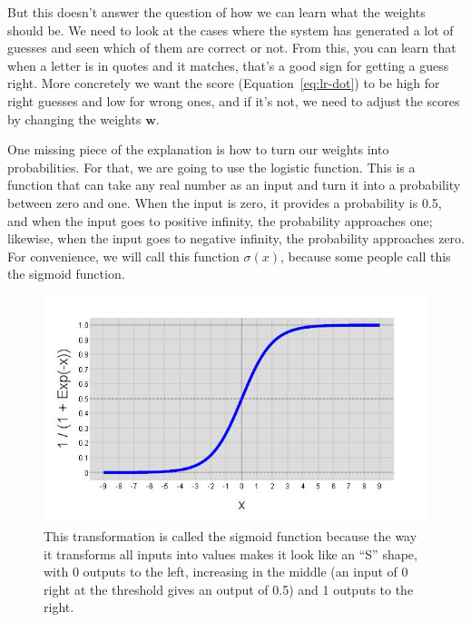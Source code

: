 But this doesn't answer the question of how we can learn what the weights
should be.
%
We need to look at the cases where the system has generated a lot of guesses
and seen which of them are correct or not.
%
From this, you can learn that when
a letter is in quotes and it matches, that’s a good sign for getting a guess right.
%
More concretely we want the score (Equation~\ref{eq:lr-dot}) to be high for
right guesses and low for wrong ones, and if it's not, we need to adjust the
scores by changing the weights ${\bm w}$.

One missing piece of the explanation is how to turn our weights into
probabilities.
%
For that, we are going to use the logistic function.
%
This is a function that can take any real number as an input and turn it into
a probability between zero and one.
%
When the input is zero, it provides a probability is 0.5, and when the input
goes to positive infinity, the probability approaches one; likewise, when the
input goes to negative infinity, the probability approaches zero.
%
For convenience, we will call this function $\sigma(x)$, because some people
call this the sigmoid function.

\begin{figure}
  \includegraphics[width=0.5\linewidth]{figures/plots/sigmoid}
\caption{This transformation is
  called the sigmoid function because the way it transforms all inputs into
  values makes it look like an ``S'' shape, with 0 outputs to the left,
  increasing in the middle (an input of 0 right at the threshold gives an
  output of 0.5) and 1 outputs to the right.}
\label{fig:watson:sigmoid}
\end{figure}

